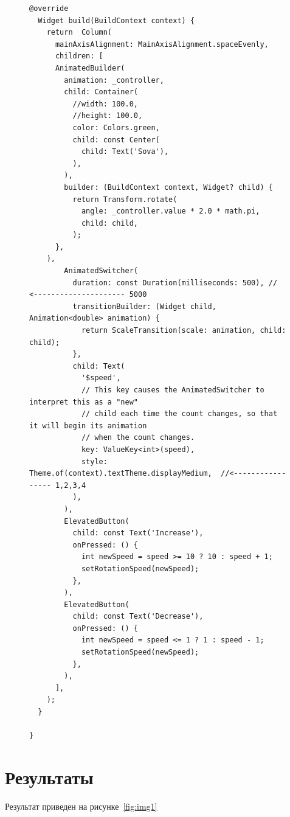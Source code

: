 \documentclass[a4paper, 14pt]{extarticle}
\begin{document}
\begin{figure}[H]
\begin{lstlisting}[language={},caption={Реализация мобильного приложения},label={lst:code1}]
  @override
  Widget build(BuildContext context) {
    return  Column(
      mainAxisAlignment: MainAxisAlignment.spaceEvenly,
      children: [
      AnimatedBuilder(
        animation: _controller,
        child: Container(
          //width: 100.0,
          //height: 100.0,
          color: Colors.green,
          child: const Center(
            child: Text('Sova'),
          ),
        ),
        builder: (BuildContext context, Widget? child) {
          return Transform.rotate(
            angle: _controller.value * 2.0 * math.pi, 
            child: child,
          );
      },
    ),
        AnimatedSwitcher(
          duration: const Duration(milliseconds: 500), // <--------------------- 5000
          transitionBuilder: (Widget child, Animation<double> animation) {
            return ScaleTransition(scale: animation, child: child);
          },
          child: Text(
            '$speed',
            // This key causes the AnimatedSwitcher to interpret this as a "new"
            // child each time the count changes, so that it will begin its animation
            // when the count changes.
            key: ValueKey<int>(speed),
            style: Theme.of(context).textTheme.displayMedium,  //<----------------- 1,2,3,4
          ),
        ),
        ElevatedButton(
          child: const Text('Increase'),
          onPressed: () {
            int newSpeed = speed >= 10 ? 10 : speed + 1;
            setRotationSpeed(newSpeed);
          },
        ),
        ElevatedButton(
          child: const Text('Decrease'),
          onPressed: () {
            int newSpeed = speed <= 1 ? 1 : speed - 1;
            setRotationSpeed(newSpeed);
          },
        ),
      ],
    );
  }

}

\end{lstlisting}
\end{figure}


\section{Результаты}

Результат приведен на рисунке~\ref{fig:img1}
\end{document}
